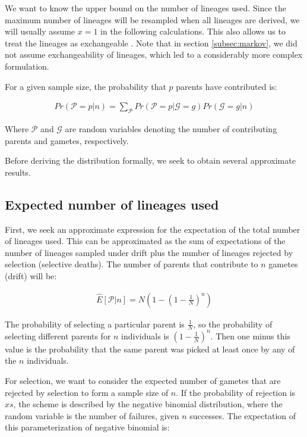 \documentclass[review]{elsarticle}
\begin{document}
We want to know the upper bound on the number of lineages used. Since the maximum number of lineages
will be resampled when all lineages are derived, we will usually assume $x=1$ in the following
calculations. This also allows us to treat the lineages as exchangeable \cite{Wakeley2009}. Note that
in section \ref{subsec:markov}, we did not assume exchangeability of lineages, which led to a
considerably more complex formulation.

For a given sample size, the probability that $p$ parents have contributed is:

\begin{align}
  \label{eq:conditional}
  Pr(\mathcal{P}=p|n) = \sum_{\mathcal{P}}Pr(\mathcal{P}=p|\mathcal{G}=g)Pr(\mathcal{G}=g|n)
\end{align}

Where $\mathcal{P}$ and $\mathcal{G}$ are random variables denoting the number of contributing
parents and gametes, respectively.

Before deriving the distribution formally, we seek to obtain several approximate results.

\subsection{Expected number of lineages used}
\label{subsec:exp-number}

First, we seek an approximate expression for the expectation of the total number of lineages used.
This can be approximated as the sum of expectations of the number of lineages sampled under drift
plus the number of lineages rejected by selection (selective deaths). The number of parents that
contribute to $n$ gametes (drift) will be:

\begin{align}
  \hat{E}[\mathcal{P}|n] = N(1-\left( 1 - \frac{1}{N} \right)^n)
\end{align}

The probability of selecting a particular parent is $\frac{1}{N}$, so the probability of selecting
different parents for $n$ individuals is $(1-\frac{1}{N})^n$. Then one minus this value is the
probability that the same parent was picked at least once by any of the $n$ individuals.

For selection, we want to consider the expected number of gametes that are rejected by selection
to form a sample size of $n$. If the probability of rejection is $xs$, the scheme is described by the
negative binomial distribution, where the random variable is the number of failures, given $n$
successes. The expectation of this parameterization of negative binomial is:
\end{document}
